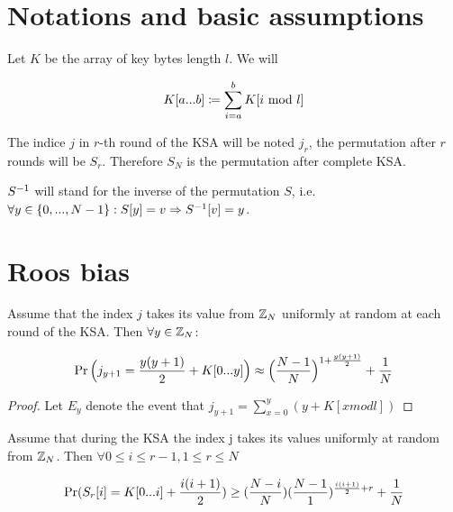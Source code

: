 \section{Notations and basic assumptions}

\begin{notation}
	Let $ K $ be the array of key bytes  length $ l $. We will  
	
	\[K[{a}...{b}] \coloneqq \sum\limits_{i=a}^{b}K[i \ \text{mod}\ l] 	\]
	
	The indice $ j $ in $ r $-th round of the KSA will be noted $ j_{r} $, the permutation after $ r $ rounds will be $ S_{r} $. Therefore $ S_{N} $ is the permutation after complete KSA.
	
	$ 	S^{-1} $ will stand for the inverse of the permutation $ S $, i.e. $ \forall y \in \{0, ... , N-1\}: S[y] = v \Rightarrow S^{-1}[v] = y$.
	

\end{notation}



\section{Roos bias}


	\begin{lemma}
		Assume that the index $ j $ takes its value from $ \mathbb{Z}_{N}  $ uniformly at random at each round of the KSA. Then $ \forall y \in \mathbb{Z}_{N} $:
		
		\[ \Pr\Big(j_{y+1} = \dfrac{y(y+1)}{2} + K[{0}...{y}] \Big) 
		\approx 
		\Big(\dfrac{N-1}{N}\Big)^{1+\frac{y(y+1)}{2}} + \dfrac{1}{N}
		\]
		
	\end{lemma}		
	\begin{proof}
		Let $ E_{y} $ denote the event that $ j_{y+1} = \sum_{x=0}^{y}(y + K[x mod l])$
	\end{proof}	
	
	\begin{lemma}
	\end{lemma}



	
	\begin{thm}{\cite{GoMa}}
		Assume that during the KSA the index j takes its values uniformly at random from $ \mathbb{Z}_{N} $. Then $ \forall 0 \leq i \leq r-1, 1 \leq r \leq N $
		
		\[ \Pr(S_{r}[i] = K[{0}...{i}] + \dfrac{i(i+1)}{2})   \geq (\dfrac{N - i}{N})(\dfrac{N-1}{1})^{\frac{i(i+1)}{2}+r}+\dfrac{1}{N} \]
	\end{thm}
	
